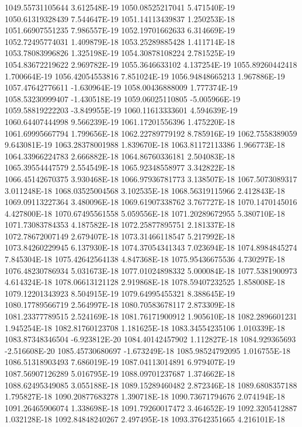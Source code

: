 1049.55731105644  3.612548E-19
1050.08525217041  5.471540E-19
1050.61319328439  7.544647E-19
1051.14113439837  1.250253E-18
1051.66907551235  7.986557E-19
1052.19701662633  6.314669E-19
1052.72495774031  1.409879E-18
1053.25289885428  1.411714E-18
1053.78083996826  1.325198E-19
1054.30878108224  2.781525E-19
1054.83672219622  2.969782E-19
1055.3646633102  4.137254E-19
1055.89260442418  1.700664E-19
1056.42054553816  7.851024E-19
1056.94848665213  1.967886E-19
1057.47642776611  -1.630964E-19
1058.00436888009  1.777374E-19
1058.53230999407  -1.430518E-19
1059.06025110805  -5.005966E-19
1059.58819222203  -3.849955E-19
1060.11613333601  4.594639E-19
1060.64407444998  9.566239E-19
1061.17201556396  1.475220E-18
1061.69995667794  1.799656E-18
1062.22789779192  8.785916E-19
1062.7558389059  9.643081E-19
1063.28378001988  1.839670E-18
1063.81172113386  1.966773E-18
1064.33966224783  2.666882E-18
1064.86760336181  2.504083E-18
1065.39554447579  2.554549E-18
1065.92348558977  3.342822E-18
1066.45142670375  3.930468E-18
1066.97936781773  3.138507E-18
1067.5073089317  3.011248E-18
1068.03525004568  3.102535E-18
1068.56319115966  2.412843E-18
1069.09113227364  3.480096E-18
1069.61907338762  3.767727E-18
1070.1470145016  4.427800E-18
1070.67495561558  5.059556E-18
1071.20289672955  5.380710E-18
1071.73083784353  4.187582E-18
1072.25877895751  2.181337E-18
1072.78672007149  2.679407E-18
1073.31466118547  5.217992E-18
1073.84260229945  6.137930E-18
1074.37054341343  7.023694E-18
1074.8984845274  7.845304E-18
1075.42642564138  4.847368E-18
1075.95436675536  4.730297E-18
1076.48230786934  5.031673E-18
1077.01024898332  5.000084E-18
1077.5381900973  4.614324E-18
1078.06613121128  2.919868E-18
1078.59407232525  1.858008E-18
1079.12201343923  8.504915E-19
1079.64995455321  8.388645E-19
1080.17789566719  2.564997E-18
1080.70583678117  2.873309E-18
1081.23377789515  2.524169E-18
1081.76171900912  1.905610E-18
1082.2896601231  1.945254E-18
1082.81760123708  1.181625E-18
1083.34554235106  1.010339E-18
1083.87348346504  -6.923812E-20
1084.40142457902  1.112827E-18
1084.929365693  -2.516608E-20
1085.45730680697  -1.673249E-18
1085.98524792095  1.016755E-18
1086.51318903493  7.686019E-19
1087.04113014891  6.979407E-19
1087.56907126289  5.016795E-19
1088.09701237687  1.374662E-18
1088.62495349085  3.055188E-18
1089.15289460482  2.872346E-18
1089.6808357188  1.795827E-18
1090.20877683278  1.390718E-18
1090.73671794676  2.074194E-18
1091.26465906074  1.338698E-18
1091.79260017472  3.464652E-19
1092.3205412887  1.032128E-18
1092.84848240267  2.497495E-18
1093.37642351665  4.216101E-18
